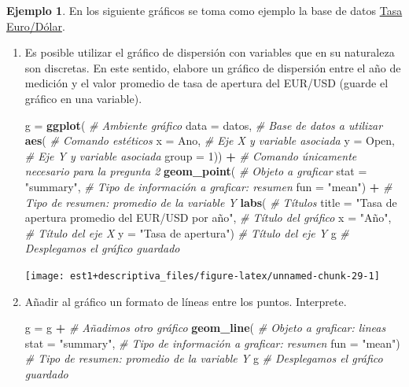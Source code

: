 \documentclass[
  11pt,
]{book}
\newenvironment{Shaded}{\begin{snugshade}}{\end{snugshade}}
\newcommand{\AttributeTok}[1]{\textcolor[rgb]{0.13,0.29,0.53}{#1}}
\newcommand{\CommentTok}[1]{\textcolor[rgb]{0.56,0.35,0.01}{\textit{#1}}}
\newcommand{\DecValTok}[1]{\textcolor[rgb]{0.00,0.00,0.81}{#1}}
\newcommand{\FunctionTok}[1]{\textcolor[rgb]{0.13,0.29,0.53}{\textbf{#1}}}
\newcommand{\NormalTok}[1]{#1}
\newcommand{\OtherTok}[1]{\textcolor[rgb]{0.56,0.35,0.01}{#1}}
\newcommand{\SpecialCharTok}[1]{\textcolor[rgb]{0.81,0.36,0.00}{\textbf{#1}}}
\newcommand{\StringTok}[1]{\textcolor[rgb]{0.31,0.60,0.02}{#1}}
\theoremstyle{definition}
\theoremstyle{definition}
\newtheorem{example}{Ejemplo}[chapter]
\theoremstyle{definition}
\theoremstyle{definition}
\theoremstyle{remark}
\begin{document}
\begin{example}

En los siguiente gráficos se toma como ejemplo la base de datos \hyperref[TasaEURUSD]{Tasa Euro/Dólar}.

\begin{enumerate}
\def\labelenumi{\arabic{enumi}.}
\item
  Es posible utilizar el gráfico de dispersión con variables que en su naturaleza son discretas. En este sentido, elabore un gráfico de dispersión entre el año de medición y el valor promedio de tasa de apertura del EUR/USD (guarde el gráfico en una variable).

\begin{Shaded}
\begin{Highlighting}[]
\NormalTok{g }\OtherTok{=} \FunctionTok{ggplot}\NormalTok{( }\CommentTok{\# Ambiente gráfico}
  \AttributeTok{data =}\NormalTok{ datos, }\CommentTok{\# Base de datos a utilizar}
  \FunctionTok{aes}\NormalTok{( }\CommentTok{\# Comando estéticos}
\AttributeTok{x =}\NormalTok{ Ano, }\CommentTok{\# Eje X y variable asociada}
\AttributeTok{y =}\NormalTok{ Open, }\CommentTok{\# Eje Y y variable asociada}
\AttributeTok{group =} \DecValTok{1}\NormalTok{)) }\SpecialCharTok{+} \CommentTok{\# Comando únicamente necesario para la pregunta 2}
  \FunctionTok{geom\_point}\NormalTok{( }\CommentTok{\# Objeto a graficar}
\AttributeTok{stat =} \StringTok{"summary"}\NormalTok{, }\CommentTok{\# Tipo de información a graficar: resumen}
\AttributeTok{fun =} \StringTok{"mean"}\NormalTok{) }\SpecialCharTok{+} \CommentTok{\# Tipo de resumen: promedio de la variable Y}
  \FunctionTok{labs}\NormalTok{( }\CommentTok{\# Títulos}
\AttributeTok{title =} \StringTok{"Tasa de apertura promedio del EUR/USD por año"}\NormalTok{, }\CommentTok{\# Título del gráfico}
\AttributeTok{x =} \StringTok{"Año"}\NormalTok{, }\CommentTok{\# Título del eje X}
\AttributeTok{y =} \StringTok{"Tasa de apertura"}\NormalTok{) }\CommentTok{\# Título del eje Y}
\NormalTok{g }\CommentTok{\# Desplegamos el gráfico guardado}
\end{Highlighting}
\end{Shaded}

  \begin{center}\texttt{[image: est1+descriptiva\_files/figure-latex/unnamed-chunk-29-1]} \end{center}
\item
  Añadir al gráfico un formato de líneas entre los puntos. Interprete.

\begin{Shaded}
\begin{Highlighting}[]
\NormalTok{g }\OtherTok{=}\NormalTok{ g }\SpecialCharTok{+} \CommentTok{\# Añadimos otro gráfico}
  \FunctionTok{geom\_line}\NormalTok{( }\CommentTok{\# Objeto a graficar: lineas}
\AttributeTok{stat =} \StringTok{"summary"}\NormalTok{, }\CommentTok{\# Tipo de información a graficar: resumen}
\AttributeTok{fun =} \StringTok{"mean"}\NormalTok{) }\CommentTok{\# Tipo de resumen: promedio de la variable Y}
\NormalTok{g }\CommentTok{\# Desplegamos el gráfico guardado}
\end{Highlighting}
\end{Shaded}


\end{enumerate}
\end{example}
\end{document}
